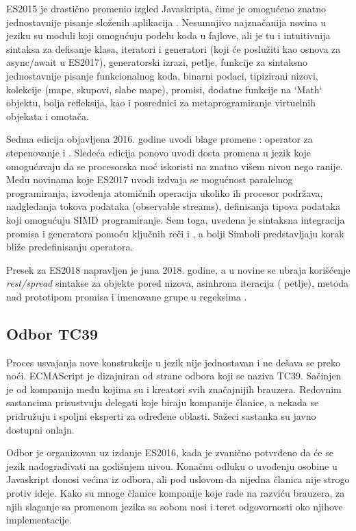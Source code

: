 ES2015 je drastično promenio izgled Javaskripta, čime je omogućeno znatno jednostavnije pisanje složenih aplikacija \cite{axel-rauschmayer:es6}.
Nesumnjivo najznačanija novina u jeziku su moduli koji omogućuju podelu koda u fajlove, ali je tu i intuitivnija sintaksa za defisanje klasa, iteratori i generatori (koji će poslužiti kao osnova za async/await u ES2017), generatorski izrazi,  petlje,  funkcije za sintaksno jednostavnije pisanje funkcionalnog koda, binarni podaci, tipizirani nizovi, kolekcije (mape, skupovi, slabe mape), promisi, dodatne funkcije na `Math` objektu, bolja refleksija, kao i posrednici za metaprogramiranje virtuelnih objekata i omotača.

Sedma edicija objavljena 2016. godine uvodi blage promene \cite{axel-rauschmayer:es2016:es2017}: operator za stepenovanje \code{**} i . Sledeća edicija ponovo uvodi dosta promena u jezik koje omogućavaju da se procesorska moć iskoristi na znatno višem nivou nego ranije. Medu novinama koje ES2017 uvodi izdvaja se mogućnost paralelnog programiranja, izvodenja atomičnih operacija ukoliko ih procesor podržava, nadgledanja tokova podataka (observable streams), definisanja tipova podataka koji omogućuju SIMD programiranje. Sem toga, uvedena je sintaksna integracija promisa i generatora pomoću ključnih reči  i , a bolji Simboli predstavljaju korak bliže predefinisanju operatora.

Presek za ES2018 napravljen je juna 2018. godine, a u novine se ubraja korišćenje \textsl{rest/spread} sintakse za objekte pored nizova, asinhrona iteracija ( petlje), metoda  nad prototipom promisa i imenovane grupe u regeksima \cite{axel-rauschmayer:es2018:es2019}.

\subsection{Odbor TC39}

Proces usvajanja nove konstrukcije u jezik nije jednostavan i ne dešava se preko noći.
ECMAScript je dizajniran od strane odbora koji se naziva TC39.
Sačinjen je od kompanija među kojima su i kreatori svih značajnijih brauzera.
Redovnim sastancima prisustvuju delegati koje biraju kompanije članice, a nekada se pridružuju i spoljni eksperti za određene oblasti.
Sažeci sastanka su javno dostupni onlajn.

Odbor je organizovan uz izdanje ES2016, kada je zvanično potvrđeno da će se jezik nadograđivati na godišnjem nivou.
Konačnu odluku o uvođenju osobine u Javaskript donosi većina iz odbora, ali pod uslovom da nijedna članica nije strogo protiv ideje.
Kako su mnoge članice kompanije koje rade na razviću brauzera, za njih slaganje sa promenom jezika sa sobom nosi i teret odgovornosti oko njihove implementacije.

